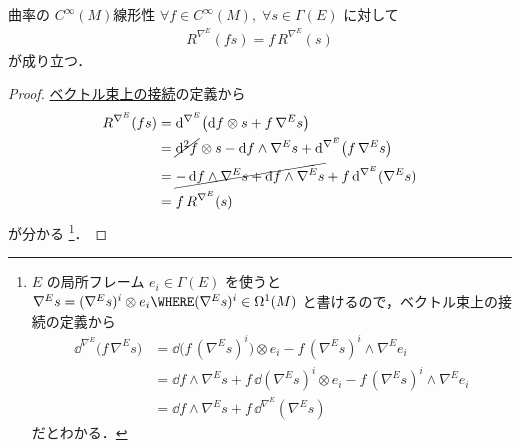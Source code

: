 \documentclass[TQFT_main]{subfiles}
\begin{document}
\begin{myprop}[label=prop:curvature-linear]{曲率の $C^\infty(M)$線形性}
    $\forall f \in C^\infty(M),\; \forall s \in \Gamma(E)$ に対して
    \begin{align}
        R^{\nabla^E} (fs) = f\, R^{\nabla^E}(s)
    \end{align}
    が成り立つ．
\end{myprop}

\begin{proof}
    \hyperref[def:connection-vect]{ベクトル束上の接続}の定義から
    \begin{align}
        R^{\nabla^E} (fs)
        &= \dd^{\nabla^E} \bigl( \dd{f} \otimes s + f\, \nabla^E s \bigr) \\
        &= \cancel{\dd[2]{f}} \otimes s - \dd{f} \wedge \nabla^E s + \dd^{\nabla^E} \bigl( f\, \nabla^E s \bigr) \\
        &= \cancel{-\dd{f} \wedge \nabla^E s + \dd{f} \wedge \nabla^E s} + f\, \dd^{\nabla^E} (\nabla^E s) \\
        &= f\, R^{\nabla^E} (s)
    \end{align}
    が分かる
    \footnote{
        $E$ の局所フレーム $e_i \in \Gamma(E)$ を使うと $\nabla^E s = (\nabla^E s)^i \otimes e_i \WHERE  (\nabla^E s)^i \in \Omega^1(M)$ と書けるので，ベクトル束上の接続の定義から
        \begin{align}
            \dd^{\nabla^E} \bigl( f\, \nabla^E s \bigr)
            &= \dd{\bigl(f\, (\nabla^E s)^i\bigr)} \otimes e_i - f\, (\nabla^E s)^i \wedge \nabla^E e_i \\
            &= \dd{f} \wedge \nabla^E s + f\, \dd{(\nabla^E s)^i} \otimes e_i  - f\, (\nabla^E s)^i \wedge \nabla^E e_i \\
            &= \dd{f} \wedge \nabla^E s + f\, \dd^{\nabla^E} (\nabla^E s)
        \end{align}
        だとわかる．
    }．
\end{proof}
\end{document}
